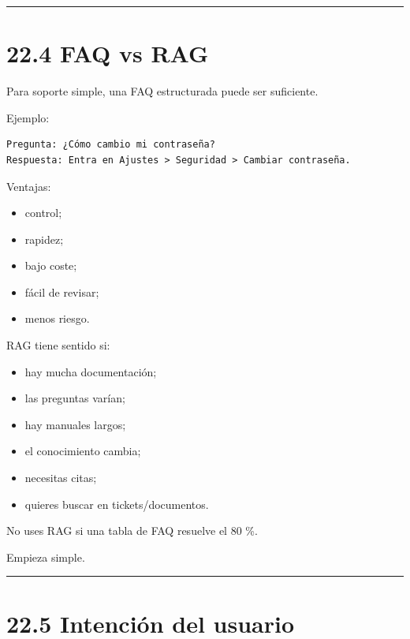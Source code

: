 \begin{center}\rule{0.5\linewidth}{0.5pt}\end{center}

\section{22.4 FAQ vs RAG}\label{faq-vs-rag}

Para soporte simple, una FAQ estructurada puede ser suficiente.

Ejemplo:

\begin{lstlisting}
Pregunta: ¿Cómo cambio mi contraseña?
Respuesta: Entra en Ajustes > Seguridad > Cambiar contraseña.
\end{lstlisting}

Ventajas:

\begin{itemize}
\tightlist
\item
  control;
\item
  rapidez;
\item
  bajo coste;
\item
  fácil de revisar;
\item
  menos riesgo.
\end{itemize}

RAG tiene sentido si:

\begin{itemize}
\tightlist
\item
  hay mucha documentación;
\item
  las preguntas varían;
\item
  hay manuales largos;
\item
  el conocimiento cambia;
\item
  necesitas citas;
\item
  quieres buscar en tickets/documentos.
\end{itemize}

No uses RAG si una tabla de FAQ resuelve el 80 \%.

Empieza simple.

\begin{center}\rule{0.5\linewidth}{0.5pt}\end{center}

\section{22.5 Intención del usuario}\label{intenciuxf3n-del-usuario}

